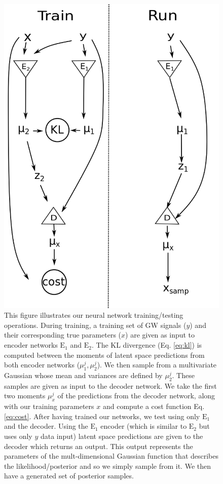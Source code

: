 \documentclass[%
showpacs,
 amsmath,amssymb,
 aps,
 twocolumn,
 prl,
 reprint,
floatfix,
]{revtex4-1}
\begin{document}
\begin{figure}
    \includegraphics[width=\columnwidth]{images/network_setup.png}
    \caption{\label{fig:network_config} This figure illustrates our neural network
training/testing operations. During training, a training set of GW signals
($y$) and their corresponding true parameters ($x$) are given as input to
encoder networks $\textrm{E}_1$ and $\textrm{E}_2$. The KL divergence (Eq.
\ref{eq:kl}) is computed between the moments of latent space predictions from both
encoder networks ($\mu^{j}_{1},\mu^{j}_{2}$). We then sample from a multivariate Gaussian whose mean and variances are defined by $\mu^{j}_{2}$. These samples are given as input to the decoder network. We take the first two moments $\mu^{j}_x$ of the predictions 
from the decoder network, along with our training parameters $x$ and compute a cost function Eq. \ref{eq:cost}. After having trained our networks, we
test using only $\textrm{E}_1$ and the decoder. Using the $\textrm{E}_1$ encoder (which is similar to $\textrm{E}_2$ but uses only $y$ data input) latent space 
predictions are given to the decoder which returns an output. This output represents the parameters of the mult-dimensional Gaussian function
that describes the likelihood/posterior and so we simply sample from it. We 
then have a generated set of posterior samples.} 
\end{figure}
\end{document}
